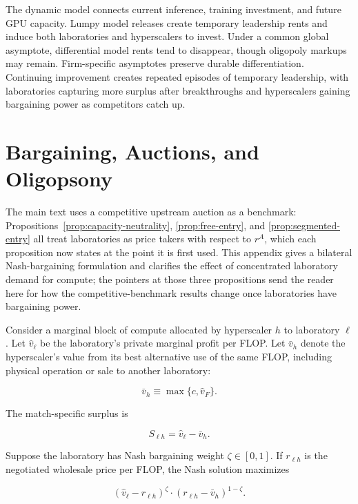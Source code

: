\documentclass[11pt]{article}
\begin{document}
The dynamic model connects current inference, training investment, and future GPU capacity. Lumpy model releases create temporary leadership rents and induce both laboratories and hyperscalers to invest. Under a common global asymptote, differential model rents tend to disappear, though oligopoly markups may remain. Firm-specific asymptotes preserve durable differentiation. Continuing improvement creates repeated episodes of temporary leadership, with laboratories capturing more surplus after breakthroughs and hyperscalers gaining bargaining power as competitors catch up.

\appendix

\section{Bargaining, Auctions, and Oligopsony}
\label{app:bargaining}

The main text uses a competitive upstream auction as a benchmark: Propositions~\ref{prop:capacity-neutrality}, \ref{prop:free-entry}, and \ref{prop:segmented-entry} all treat laboratories as price takers with respect to $r^A$, which each proposition now states at the point it is first used. This appendix gives a bilateral Nash-bargaining formulation and clarifies the effect of concentrated laboratory demand for compute; the pointers at those three propositions send the reader here for how the competitive-benchmark results change once laboratories have bargaining power.

Consider a marginal block of compute allocated by hyperscaler $h$ to laboratory $\ell$. Let $\widehat v_\ell$ be the laboratory's private marginal profit per FLOP. Let $\bar v_h$ denote the hyperscaler's value from its best alternative use of the same FLOP, including physical operation or sale to another laboratory:

\begin{equation}\bar v_h\equiv\max\{c,\widehat v_F\}.\end{equation}

The match-specific surplus is

\begin{equation}S_{\ell h}=\widehat v_\ell-\bar v_h.\end{equation}

Suppose the laboratory has Nash bargaining weight $\zeta\in[0,1]$. If $r_{\ell h}$ is the negotiated wholesale price per FLOP, the Nash solution maximizes

\begin{equation}\left(\widehat v_\ell-r_{\ell h}\right)^\zeta\cdot\left(r_{\ell h}-\bar v_h\right)^{1-\zeta}.\end{equation}
\end{document}

